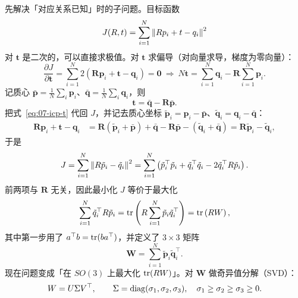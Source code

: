 先解决「对应关系已知」时的子问题。目标函数
\begin{equation}
  J(R,t) = \sum_{i=1}^{N}\left\lVert Rp_i+t-q_i \right\rVert^{2}
\end{equation}
对 $\bm{t}$ 是二次的，可以直接求极值。对 $\bm{t}$ 求偏导（对向量求导，梯度为零向量）：
\begin{equation}
  \frac{\partial J}{\partial \bm{t}}
  = \sum_{i=1}^{N}2\left(\bm{R}\bm{p}_i+\bm{t}-\bm{q}_i\right)=\bm{0}
  \ \Longrightarrow\
  N\bm{t} = \sum_{i=1}^{N}\bm{q}_i - \bm{R}\sum_{i=1}^{N}\bm{p}_i.
\end{equation}
记质心 $\bar{\bm{p}}=\frac{1}{N}\sum_i\bm{p}_i$、$\bar{\bm{q}}=\frac{1}{N}\sum_i\bm{q}_i$，则
\begin{equation}
  \bm{t} = \bar{\bm{q}}-\bm{R}\bar{\bm{p}}.
  \label{eq:07-icp-t}
\end{equation}
把式~\eqref{eq:07-icp-t} 代回 $J$，并记去质心坐标 $\tilde{\bm{p}}_i=\bm{p}_i-\bar{\bm{p}}$、$\tilde{\bm{q}}_i=\bm{q}_i-\bar{\bm{q}}$：
\begin{align}
  \bm{R}\bm{p}_i+\bm{t}-\bm{q}_i
  &= \bm{R}\left(\tilde{\bm{p}}_i+\bar{\bm{p}}\right)+\bar{\bm{q}}-\bm{R}\bar{\bm{p}}-\left(\tilde{\bm{q}}_i+\bar{\bm{q}}\right)
  = \bm{R}\tilde{\bm{p}}_i-\tilde{\bm{q}}_i,
\end{align}
于是
\begin{equation}
  J = \sum_{i=1}^{N}\left\lVert R\tilde{p}_i-\tilde{q}_i \right\rVert^{2}
  = \sum_{i=1}^{N}\left(\tilde{p}_i^{\top}\tilde{p}_i+\tilde{q}_i^{\top}\tilde{q}_i
  -2\tilde{q}_i^{\top}R\tilde{p}_i\right).
  \label{eq:07-icp-decoupled}
\end{equation}
前两项与 $\bm{R}$ 无关，因此最小化 $J$ 等价于最大化
\begin{equation}
  \sum_{i=1}^{N}\tilde{q}_i^{\top}R\tilde{p}_i
  = \operatorname{tr}\left(R\sum_{i=1}^{N}\tilde{p}_i\tilde{q}_i^{\top}\right)
  = \operatorname{tr}\left(RW\right),
  \label{eq:07-icp-trace}
\end{equation}
其中第一步用了 $a^{\top}b=\operatorname{tr}(ba^{\top})$，并定义了 $3\times3$ 矩阵
\begin{equation}
  \bm{W} = \sum_{i=1}^{N}\tilde{\bm{p}}_i\tilde{\bm{q}}_i^{\top}.
  \label{eq:07-icp-W}
\end{equation}
现在问题变成「在 $SO(3)$ 上最大化 $\operatorname{tr}(RW)$」。对 $\bm{W}$ 做奇异值分解（SVD）：
\begin{equation}
  W = U\Sigma V^{\top},
  \qquad
  \Sigma=\operatorname{diag}(\sigma_1,\sigma_2,\sigma_3),\quad \sigma_1\ge\sigma_2\ge\sigma_3\ge0.
\end{equation}
